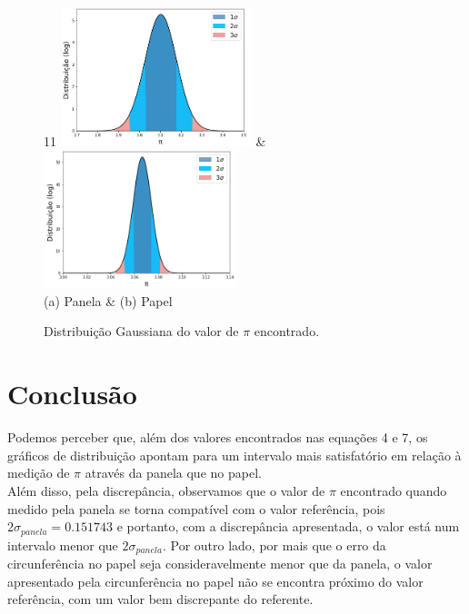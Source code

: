 \documentclass[11pt, letterpaper]{article}
\begin{document}
\begin{enumerate}
\begin{figure}[!htbp]
\centering
\begin{tabular}{11}
\includegraphics[width=0.4959\textwidth]{dis_pan.png} &
 \includegraphics[width=0.5\textwidth]{dis_papel.png}
 \\
 (a) Panela & (b) Papel
\end{tabular}
\caption{Distribuição Gaussiana do valor de $\pi$ encontrado.}
\end{figure}
\newpage
\section{Conclusão}
Podemos perceber que, além dos valores encontrados nas equações 4 e 7, os gráficos de distribuição apontam para um intervalo mais satisfatório em relação à medição de $\pi$ através da panela que no papel. \\
Além disso, pela discrepância, observamos que o valor de $\pi$ encontrado quando medido pela panela se torna compatível com o valor referência, pois $ 2\sigma_{panela} = 0.151743 $ e portanto, com a discrepância apresentada, o valor está num intervalo menor que $2\sigma_{panela}$. Por outro lado, por mais que o erro da circunferência no papel seja consideravelmente menor que da panela, o valor apresentado pela circunferência no papel não se encontra próximo do valor referência, com um valor bem discrepante do referente.


\end{enumerate}
\end{document}

